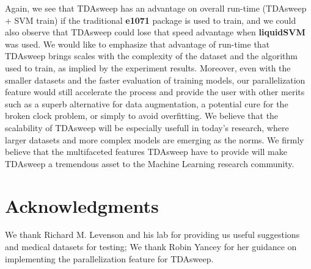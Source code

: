 \documentclass{article}
\begin{document}
Again, we see that TDAsweep has an advantage on overall run-time (TDAsweep + SVM train) if the traditional \textbf{e1071} package is used to train, and we could also observe that TDAsweep could lose that speed advantage when \textbf{liquidSVM} was used. We would like to emphasize that advantage of run-time that TDAsweep brings scales with the complexity of the dataset and the algorithm used to train, as implied by the experiment results. Moreover, even with the smaller datasets and the faster evaluation of training models, our parallelization feature would still accelerate the process and provide the user with other merits such as a superb alternative for data augmentation, a potential cure for the broken clock problem, or simply to avoid overfitting. We believe that the scalability of TDAsweep will be especially usefull in today's research, where larger datasets and more complex models are emerging as the norms. We firmly believe that the multifaceted features TDAsweep have to provide will make TDAsweep a tremendous asset to the Machine Learning research community.





\section{Acknowledgments}
We thank Richard M. Levenson and his lab for providing us useful suggestions and medical datasets for testing; We thank Robin Yancey for her guidance on implementing the parallelization feature for TDAsweep.

% 

% 

  
\end{document}
